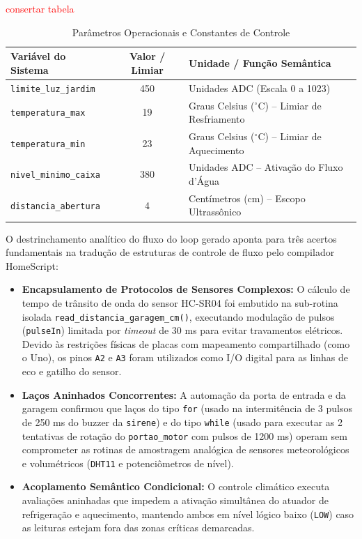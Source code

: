 \documentclass[conference]{IEEEtran}
\begin{document}
\textcolor{red}{consertar tabela}

\begin{table}[htbp]
\caption{Parâmetros Operacionais e Constantes de Controle}
\label{tab:limiares}
\centering
\begin{tabular}{lcl}
\toprule
\textbf{Variável do Sistema} & \textbf{Valor / Limiar} & \textbf{Unidade / Função Semântica} \\
\midrule
\texttt{limite\_luz\_jardim} & 450 & Unidades ADC (Escala 0 a 1023) \\
\texttt{temperatura\_max} & 19 & Graus Celsius ($^{\circ}$C) -- Limiar de Resfriamento \\
\texttt{temperatura\_min} & 23 & Graus Celsius ($^{\circ}$C) -- Limiar de Aquecimento \\
\texttt{nivel\_minimo\_caixa} & 380 & Unidades ADC -- Ativação do Fluxo d'Água \\
\texttt{distancia\_abertura} & 4 & Centímetros (cm) -- Escopo Ultrassônico \\
\bottomrule
\end{tabular}
\end{table}

O destrinchamento analítico do fluxo do loop gerado aponta para três acertos fundamentais na tradução de estruturas de controle de fluxo pelo compilador HomeScript:
\begin{itemize}
    \item \textbf{Encapsulamento de Protocolos de Sensores Complexos:} O cálculo de tempo de trânsito de onda do sensor HC-SR04 foi embutido na sub-rotina isolada \texttt{read\_distancia\_garagem\_cm()}, executando modulação de pulsos (\texttt{pulseIn}) limitada por \textit{timeout} de 30 ms para evitar travamentos elétricos. Devido às restrições físicas de placas com mapeamento compartilhado (como o Uno), os pinos \texttt{A2} e \texttt{A3} foram utilizados como I/O digital para as linhas de eco e gatilho do sensor.
    \item \textbf{Laços Aninhados Concorrentes:} A automação da porta de entrada e da garagem confirmou que laços do tipo \texttt{for} (usado na intermitência de 3 pulsos de 250 ms do buzzer da \texttt{sirene}) e do tipo \texttt{while} (usado para executar as 2 tentativas de rotação do \texttt{portao\_motor} com pulsos de 1200 ms) operam sem comprometer as rotinas de amostragem analógica de sensores meteorológicos e volumétricos (\texttt{DHT11} e potenciômetros de nível).
    \item \textbf{Acoplamento Semântico Condicional:} O controle climático executa avaliações aninhadas que impedem a ativação simultânea do atuador de refrigeração e aquecimento, mantendo ambos em nível lógico baixo (\texttt{LOW}) caso as leituras estejam fora das zonas críticas demarcadas.
\end{itemize}
\end{document}
